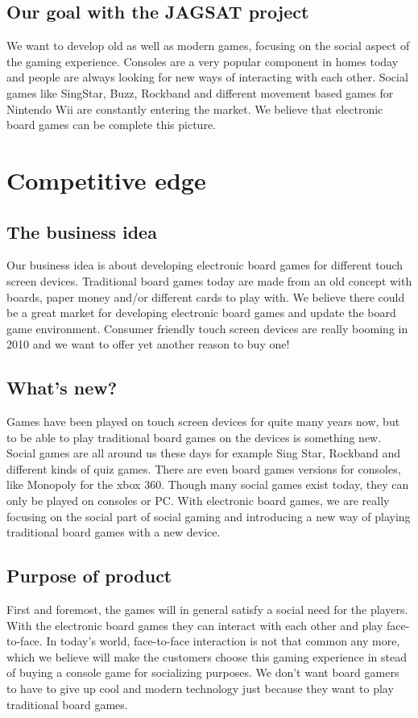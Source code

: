 \documentclass[12pt,a4paper]{article}
\begin{document}
\subsection{Our goal with the JAGSAT project}
We want to develop old as well as modern games, focusing on the social aspect of the gaming experience. Consoles are a very popular component in homes today and people are always looking for new ways of interacting with each other. Social games like SingStar, Buzz, Rockband and different movement based games for Nintendo Wii are constantly entering the market. We believe that electronic board games can be complete this picture.

\section{Competitive edge}
\subsection{The business idea}
Our business idea is about developing electronic board games for different touch screen devices. Traditional board games today are made from an old concept with boards, paper money and/or different cards to play with. We believe there could be a great market for developing electronic board games and update the board game environment. Consumer friendly touch screen devices are really booming in 2010 and we want to offer yet another reason to buy one!

\subsection{What's new?}
Games have been played on touch screen devices for quite many years now, but to be able to play traditional board games on the devices is something new. Social games are all around us these days for example Sing Star, Rockband and different kinds of quiz games. There are even board games versions for consoles, like Monopoly for the xbox 360. Though many social games exist today, they can only be played on consoles or PC. With electronic board games, we are really focusing on the social part of social gaming and introducing a new way of playing traditional board games with a new device.

\subsection{Purpose of product}
First and foremost, the games will in general satisfy a social need for the players. With the electronic board games they can interact with each other and play face-to-face. In today's world, face-to-face interaction is not that common any more, which we believe will make the customers choose this gaming experience in stead of buying a console game for socializing purposes. We don't want board gamers to have to give up cool and modern technology just because they want to play traditional board games.
\end{document}
